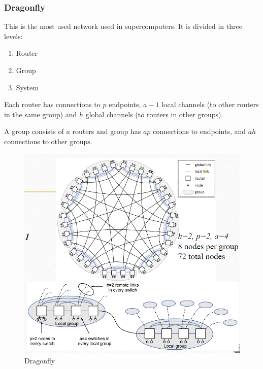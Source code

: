 \subsubsection{Dragonfly}

\begin{paracol}{2}
   
   This is the most used network used in supercomputers. It is divided in three levels:
   \begin{enumerate}
      \item Router
      \item Group
      \item System
   \end{enumerate}
   
   Each router has connections to $p$ endpoints, $a-1$ local channels (to other routers in the same group) and $h$ global channels (to routers in other groups).
   
   A group consists of $a$ routers and group has $ap$ connections to endpoints, and $ah$ connections to other groups.
   
   \switchcolumn
   \begin{figure}[htbp]
      \centering
      \includegraphics{images/05/dragonfly.png}
      \caption{Dragonfly}
      \label{fig:05/dragonfly}
   \end{figure}
\end{paracol}